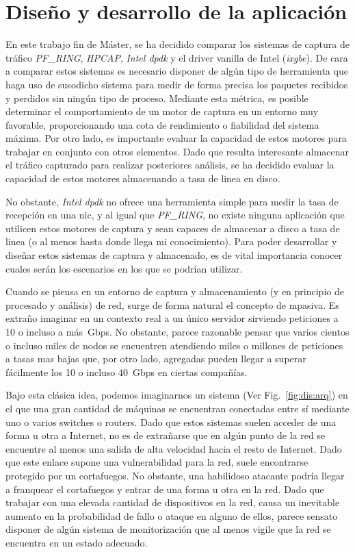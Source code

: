 \chapter{Diseño y desarrollo de la aplicación\label{sec:disenho}}

En este trabajo fin de Máster, se ha decidido comparar los sistemas de captura de tráfico \textit{PF\_RING}, \textit{HPCAP}, \textit{Intel \gls{dpdk}} y el driver \gls{vanilla} de Intel (\textit{ixgbe}).
De cara a comparar estos sistemas es necesario disponer de algún tipo de herramienta que haga uso de susodicho sistema para medir de forma precisa los paquetes recibidos y perdidos sin ningún tipo de proceso.
Mediante esta métrica, es posible determinar el comportamiento de un motor de captura en un entorno muy favorable, proporcionando una cota de rendimiento o fiabilidad del sistema máxima. 
Por otro lado, es importante evaluar la capacidad de estos motores para trabajar en conjunto con otros elementos. Dado que resulta interesante almacenar el tráfico capturado para realizar posteriores análisis, se ha decidido evaluar la capacidad de estos motores almacenando a tasa de linea en disco.

No obstante, \textit{Intel \gls{dpdk}} no ofrece una herramienta simple para medir la tasa de recepción en una \gls{nic}, y al igual que \textit{PF\_RING}, no existe ninguna aplicación que utilicen estos motores de captura y sean capaces de almacenar a disco a tasa de linea (o al menos hasta donde llega mi conocimiento). Para poder desarrollar y diseñar estos sistemas de captura y almacenado, es de vital importancia conocer cuales serán los escenarios en los que se podrían utilizar.


Cuando se piensa en un entorno de captura y almacenamiento (y en principio de procesado y análisis) de red, surge de forma natural el concepto de \gls{mpasiva}. Es extraño imaginar en un contexto real a un único servidor sirviendo peticiones a 10 o incluso a más~Gbps. No obstante, parece razonable pensar que varios cientos o incluso miles de nodos se encuentren atendiendo miles o millones de peticiones a tasas mas bajas que, por otro lado, agregadas pueden llegar a superar fácilmente los 10 o incluso 40~Gbps en ciertas compañías.

Bajo esta clásica idea, podemos imaginarnos un sistema (Ver Fig.~\ref{fig:dis:arq}) en el que una gran cantidad de máquinas se encuentran conectadas entre sí mediante uno o varios switches o routers. Dado que estos sistemas suelen acceder de una forma u otra a Internet, no es de extrañarse que en algún punto de la red se encuentre al menos una salida de alta velocidad hacia el resto de Internet. Dado que este enlace supone una vulnerabilidad para la red, suele encontrarse protegido por un cortafuegos. No obstante, una habilidoso atacante podría llegar a franquear el cortafuegos y entrar de una forma u otra en la red.
Dado que trabajar con una elevada cantidad de dispositivos en la red, causa un inevitable aumento en la probabilidad de fallo o ataque en alguno de ellos, parece sensato disponer de algún sistema de monitorización que al menos vigile que la red se encuentra en un estado adecuado. 

